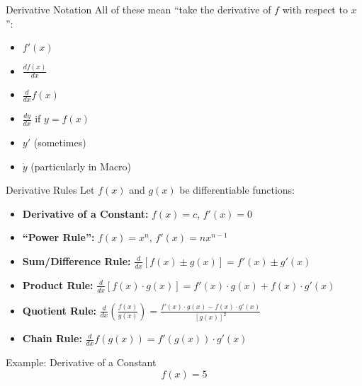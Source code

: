 \documentclass[aspectratio=169]{beamer}
\begin{document}
\begin{frame}{Derivative Notation}\label{main1}
All of these mean “take the derivative of \(f\) with respect to \(x\)”:
\begin{itemize}
\begin{itemize}
    \item \(f'(x)\)
    \item \(\frac{df(x)}{dx}\)
    \item \(\frac{d}{dx} f(x)\)
    \item \(\frac{dy}{dx}\) if \(y = f(x)\)
    \item \(y'\) (sometimes)
    \item \( \dot{y} \) (particularly in Macro)
\end{itemize}
\end{itemize}
\end{frame}

\begin{frame}{Derivative Rules}\label{main1}
Let \(f(x)\) and \(g(x)\) be differentiable functions:
\begin{itemize}
    \item \textbf{Derivative of a Constant:} \(f(x) = c\), \(f'(x) = 0\)
    \item \textbf{“Power Rule”:} \(f(x) = x^n\), \(f'(x) = nx^{n-1}\) 
    \item \textbf{Sum/Difference Rule:} \quad $\frac{d}{dx} [f(x) \pm g(x)] = f'(x) \pm g'(x)$
    \item \textbf{Product Rule:} \quad $\frac{d}{dx} [f(x) \cdot g(x)] = f'(x) \cdot g(x) + f(x) \cdot g'(x)$
    \item \textbf{Quotient Rule:} \quad $\frac{d}{dx} \left( \frac{f(x)}{g(x)} \right) = \frac{f'(x) \cdot g(x) - f(x) \cdot g'(x)}{[g(x)]^2}$
    \item \textbf{Chain Rule:} \quad $\frac{d}{dx} f(g(x)) = f'(g(x)) \cdot g'(x)$
\end{itemize}
\end{frame}

\begin{frame}{Example: Derivative of a Constant}\label{const_rule}
	\vspace{-4cm}    
    \[
    f(x) = 5
    \]
\end{frame}
\end{document}
